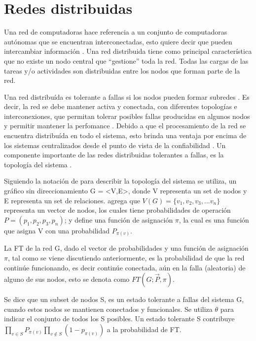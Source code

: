 \section{Redes distribuidas}\label{sec:redes_distribuidas}
Una red de computadoras hace referencia a un conjunto de computadoras autónomas que se encuentran interconectadas, esto quiere decir que pueden intercambiar información \citep{Tanenbaum12}. Una red distribuida tiene como principal característica que no existe un nodo central que ``gestione'' toda la red. Todas las cargas de las tareas y/o actividades son distribuidas entre los nodos que forman parte de la red.

Una red distribuída es tolerante a fallas si los nodos pueden formar subredes \citep{Stivaros92}. Es decir, la red se debe mantener activa y conectada, con diferentes topologías e interconexiones, que permitan tolerar posibles fallas producidas en algunos nodos y permitir mantener la perfomance \citep{Stivaros92}. Debido a que el procesamiento de la red se encuentra distribuída en todo el sistema, esto brinda una ventaja por encima de los sistemas centralizados desde el punto de vista de la confiabilidad \citep{Pradhan82}. Un componente importante de las redes distribuidas tolerantes a fallas, es la topología del sistema \citep{Pradhan82}.

Siguiendo la notación de \cite{Pradhan82} para describir la topología del sistema se utiliza, un gráfico sin direccionamiento G = <V,E>, donde V representa un set de nodos y E representa un set de relaciones. \cite{Stivaros92} agrega que $V(G) = \{v_1,v_2,v_3, ... v_n \}$ representa un vector de nodos, los cuales tiene probabilidades de operación $P = (p_1, p_2, p_3, p_n)$; y define una función de asignación $\pi$, la cual es una función que asigna V con una probabilidad $P_{\pi(v)}$.

La \ac{FT} de la red G, dado el vector de probabilidades  y una función de asignación $\pi$, tal como se viene discutiendo anteriormente, es la probabilidad de que la red continúe funcionando, es decir continúe conectada, aún en la falla (aleatoria) de alguno de sus nodos, esto se denota  como $FT(G;\vec{P},\pi)$.

Se dice que un subset de nodos S, es un estado tolerante a fallas del sistema G, cuando estos nodos se mantienen conectados y funcionales. Se utiliza $\theta$ para indicar el conjunto de todos los S posibles. Un estado tolerante S contribuye $\prod_{v\in S}{P_{\pi (v)}} \prod_{v \notin S} (1-p_{\pi (v)})$ a la probabilidad de \ac{FT}.

